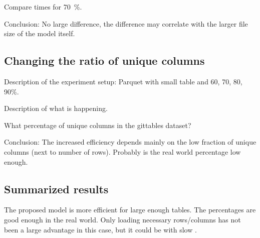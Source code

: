 Compare times for \SI{70}{\percent}.

Conclusion: No large difference, the difference may correlate with the larger file size of the model itself.


\subsection{Changing the ratio of unique columns}\label{subsec:efficiency-changing_uniques} %
Description of the experiment setup: Parquet with small table and 60, 70, 80, 90\%.

Description of what is happening.

What percentage of unique columns in the gittables dataset?

Conclusion: The increased efficiency depends mainly on the low fraction of unique columns (next to number of rows). Probably is the real world percentage low enough.


\subsection{Summarized results}\label{subsec:efficiency-summarized_results} %
The proposed model is more efficient for large enough tables. The percentages are good enough in the real world. Only loading necessary rows/columns has not been a large advantage in this case, but it could be with slow \io{}.
